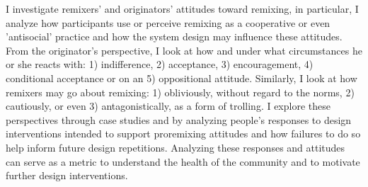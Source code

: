 I investigate remixers' and originators' attitudes toward remixing, in particular, I analyze how participants use or perceive remixing as a cooperative or even 'antisocial' practice and how the system design may influence these attitudes. From the originator's perspective, I look at how and under what circumstances he or she reacts with: 
1) indifference, 
2) acceptance, 
3) encouragement, 
4) conditional acceptance or on an 
5) oppositional attitude. 
Similarly, I look at how remixers may go about remixing: 
1) obliviously, without regard to the norms, 
2) cautiously, or even 
3) antagonistically, as a form of trolling.
I explore these perspectives through case studies and by analyzing people's responses to design interventions intended to support proremixing attitudes and how failures to do so help inform future design repetitions. Analyzing these responses and attitudes can serve as a metric to understand the health of the community and to motivate further design interventions.

